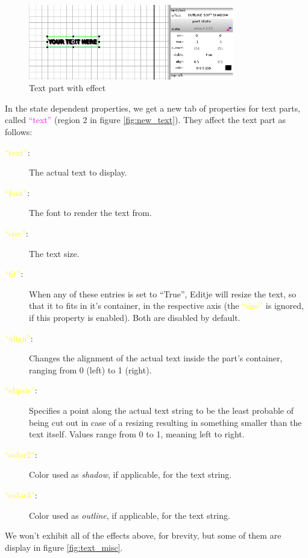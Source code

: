\documentclass[a4paper]{profusion}
\newcommand{\GUILabel}[1]{\textcolor{magenta}{#1}}
\newcommand{\GUIEditable}[1]{\textcolor{yellow}{#1}} %
\begin{document}
\begin{figure}[h!]
  \centering
  \includegraphics[width=0.8\textwidth]{images/text_effect.png}
  \caption{Text part with effect}
  \label{fig:text_effect}
\end{figure}

In the state dependent properties, we get a new tab of properties for
text parts, called \GUILabel{``text''} (region 2 in figure
\ref{fig:new_text}).  They affect the text part as follows:

\begin{description}
\item[\GUIEditable{``text''}:] The actual text to display.
\item[\GUIEditable{``font''}:] The font to render the text from.
\item[\GUIEditable{``size''}:] The text size.
\item[\GUIEditable{``fit''}:] When any of these entries is set to
  ``True'', Editje will resize the text, so that it to fits in it's
  container, in the respective axis (the \GUIEditable{``size''} is
  ignored, if this property is enabled). Both are disabled by default.
\item[\GUIEditable{``align''}:] Changes the alignment of the actual
  text inside the part's container, ranging from 0 (left) to 1
  (right).
\item[\GUIEditable{``elipsis''}:] Specifies a point along the actual
  text string to be the least probable of being cut out in case of a
  resizing resulting in something smaller than the text itself. Values
  range from 0 to 1, meaning left to right.
\item[\GUIEditable{``color2''}:] Color used as \emph{shadow}, if
  applicable, for the text string.
\item[\GUIEditable{``color3''}:] Color used as \emph{outline}, if
  applicable, for the text string.
\end{description}

We won't exhibit all of the effects above, for brevity, but some of
them are display in figure \ref{fig:text_misc}.
\end{document}
